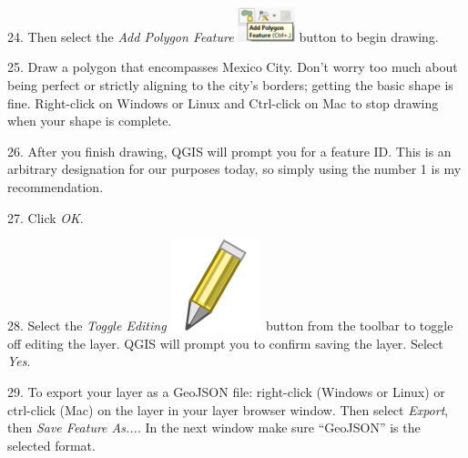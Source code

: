 \documentclass[oneside,a4paper,11pt,explicit]{book}
\begin{document}
24. Then select the \textit{Add Polygon Feature} \includegraphics[height=10mm]{addpolygon.png} button to begin drawing. 

25. Draw a polygon that encompasses Mexico City. Don't worry too much about being perfect or strictly aligning to the city's borders; getting the basic shape is fine. Right-click on Windows or Linux and Ctrl-click on Mac to stop drawing when your shape is complete.


26. After you finish drawing, QGIS will prompt you for a feature ID. This is an arbitrary designation for our purposes today, so simply using the number 1 is my recommendation. 

27. Click \textit{OK}. 

28. Select the \textit{Toggle Editing} \includegraphics[height=\fontcharht\font`\B]{mActionToggleEditing.png} button from the toolbar to toggle off editing the layer. QGIS will prompt you to confirm saving the layer. Select \textit{Yes}.

29. To export your layer as a GeoJSON file: right-click (Windows or Linux) or ctrl-click (Mac) on the layer in your layer browser window. Then select \textit{Export}, then \textit{Save Feature As...}. In the next window make sure ``GeoJSON'' is the selected format.

\end{document}
